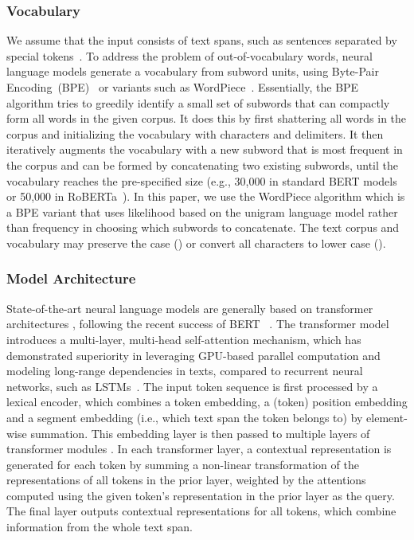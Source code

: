 \documentclass[acmlarge,screen,nonacm]{acmart}
\begin{document}
\subsubsection{Vocabulary}
\label{subsec:bert-vocab}
We assume that the input consists of text spans, such as sentences separated by special tokens~. To address the problem of out-of-vocabulary words, neural language models generate a vocabulary from subword units, using Byte-Pair Encoding~(BPE)~\cite{sennrich2015bpe} or variants such as WordPiece~\cite{kudo2018sentencepiece}.
Essentially, the BPE algorithm tries to greedily identify a small set of subwords that can compactly form all words in the given corpus. It does this by first shattering all words in the corpus and initializing the vocabulary with characters and delimiters.  It then iteratively augments the vocabulary with a new subword that is most frequent in the corpus and can be formed by concatenating two existing subwords, until the vocabulary reaches the pre-specified size (e.g., 30,000 in standard BERT models or 50,000 in RoBERTa~\cite{liu2019roberta}). In this paper, we use the WordPiece algorithm which is a BPE variant that uses likelihood based on the unigram language model rather than frequency in choosing which subwords to concatenate. 
The text corpus and vocabulary may preserve the case () or convert all characters to lower case ().



\subsubsection{Model Architecture}
\label{subsec:bert-mdl}
State-of-the-art neural language models are generally based on transformer architectures \cite{vaswani2017attention}, following the recent success of BERT ~\cite{devlin2018bert,liu2019roberta}.
The transformer model introduces a multi-layer, multi-head self-attention mechanism, which has demonstrated superiority in leveraging GPU-based parallel computation and modeling long-range dependencies in texts, compared to recurrent neural networks, such as LSTMs~\cite{hochreiter1997lstm}. 
The input token sequence is first processed by a lexical encoder, which combines a token embedding, a (token) position embedding and a segment embedding (i.e., which text span the token belongs to) by element-wise summation. 
This embedding layer is then passed to multiple layers of transformer modules \cite{vaswani2017attention}. 
In each transformer layer, a contextual representation is generated for each token by summing a non-linear transformation of the representations of all tokens in the prior layer, weighted by the attentions computed using the given token's representation in the prior layer as the query.
The final layer outputs contextual representations for all tokens, which combine information from the whole text span.
\end{document}
